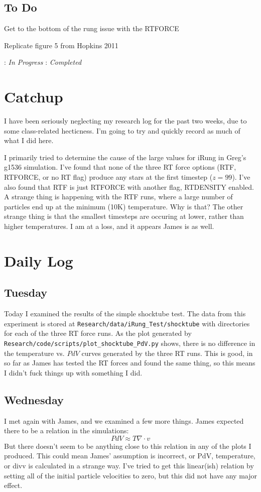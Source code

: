 \documentclass[11pt,letterpaper]{article}
\begin{document}
\subsection*{To Do}
\begin{bullets}
\item[\textleaf] Get to the bottom of the rung issue with the RTFORCE
\item[\textleaf] Replicate figure 5 from Hopkins 2011
\end{bullets}

\textleaf : \textit{In Progress} \qquad \checkmark : \textit{Completed}

\section*{Catchup}
I have been seriously neglecting my research log for the past two weeks, due to
some class-related hecticness.  I'm going to try and quickly record as much of
what I did here.

I primarily tried to determine the cause of the large values for iRung in Greg's
g1536 simulation.  I've found that none of the three RT force options (RTF, 
RTFORCE, or no RT flag) produce any stars at the first timestep ($z=99$). I've
also found that RTF is just RTFORCE with another flag, RTDENSITY enabled.  A
strange thing is happening with the RTF runs, where a large number of particles
end up at the minimum (10K) temperature.  Why is that?  The other strange thing
is that the smallest timesteps are occuring at lower, rather than higher 
temperatures.  I am at a loss, and it appears James is as well.

\section*{Daily Log}
\subsection*{Tuesday}
Today I examined the results of the simple shocktube test.  The data from this
experiment is stored at \verb!Research/data/iRung_Test/shocktube! with 
directories for each of the three RT force runs.  As the plot generated by 
\verb!Research/code/scripts/plot_shocktube_PdV.py! shows, there is no difference
in the temperature vs. $PdV$ curves generated by the three RT runs.  This is
good, in so far as James has tested the RT forces and found the same thing, so
this means I didn't fuck things up with something I did.
\subsection*{Wednesday}
I met again with James, and we examined a few more things.  James expected there
to be a relation in the simulations:
$$PdV \approx T\nabla\cdot v$$
But there doesn't seem to be anything close to this relation in any of the plots
I produced.  This could mean James' assumption is incorrect, or PdV,
temperature, or divv is calculated in a strange way.  I've tried to get this
linear(ish) relation by setting all of the initial particle velocities to zero,
but this did not have any major effect.
\end{document}
